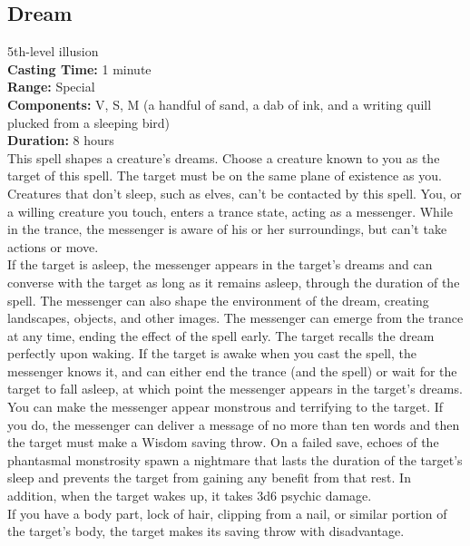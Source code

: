 \documentclass[11pt, A4paper, english]{article}
\begin{document}
		\subsection{Dream}
5th-level illusion \\
\textbf{Casting Time:} 1 minute \\
\textbf{Range:} Special \\
\textbf{Components:} V, S, M (a handful of sand, a dab of ink, and a writing quill plucked from a sleeping bird) \\
\textbf{Duration:} 8 hours \\
This spell shapes a creature’s dreams. Choose a creature known to you as the target of this spell. The target must be on the same plane of existence as you. Creatures that don’t sleep, such as elves, can’t be contacted by this spell. You, or a willing creature you touch, enters a trance state, acting as a messenger. While in the trance, the messenger is aware of his or her surroundings, but can’t take actions or move. \\
If the target is asleep, the messenger appears in the target’s dreams and can converse with the target as long as it remains asleep, through the duration of the spell. The messenger can also shape the environment of the dream, creating landscapes, objects, and other images. The messenger can emerge from the trance at any time, ending the effect of the spell early. The target recalls the dream perfectly upon waking. If the target is awake when you cast the spell, the messenger knows it, and can either end the trance (and the spell) or wait for the target to fall asleep, at which point the messenger appears in the target’s dreams. \\
You can make the messenger appear monstrous and terrifying to the target. If you do, the messenger can deliver a message of no more than ten words and then the target must make a Wisdom  saving throw. On a failed save, echoes of the phantasmal monstrosity spawn a nightmare that lasts the duration of the target’s sleep and prevents the target from gaining any benefit from that rest. In addition, when the target wakes up, it takes 3d6 psychic damage. \\
If you have a body part, lock of hair, clipping from a nail, or similar portion of the target’s body, the target makes its saving throw with disadvantage.
\end{document}
